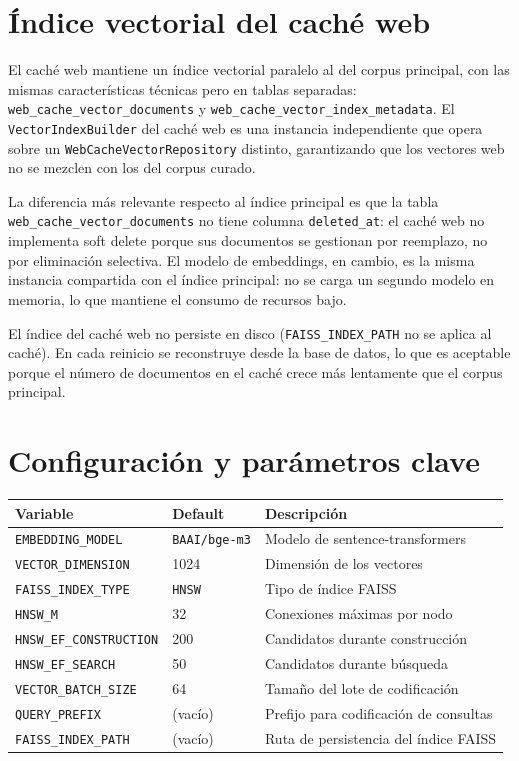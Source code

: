 \documentclass[11pt]{article}
\begin{document}
\section{Índice vectorial del caché web}

El caché web mantiene un índice vectorial paralelo al del corpus principal, con las mismas
características técnicas pero en tablas separadas: \texttt{web\_cache\_vector\_documents} y
\texttt{web\_cache\_vector\_index\_metadata}. El \texttt{VectorIndexBuilder} del caché web
es una instancia independiente que opera sobre un \texttt{WebCacheVectorRepository} distinto,
garantizando que los vectores web no se mezclen con los del corpus curado.

La diferencia más relevante respecto al índice principal es que la tabla
\texttt{web\_cache\_vector\_documents} no tiene columna \texttt{deleted\_at}: el caché web no
implementa soft delete porque sus documentos se gestionan por reemplazo, no por eliminación
selectiva. El modelo de embeddings, en cambio, es la misma instancia compartida con el índice
principal: no se carga un segundo modelo en memoria, lo que mantiene el consumo de recursos
bajo.

El índice del caché web no persiste en disco (\texttt{FAISS\_INDEX\_PATH} no se aplica al
caché). En cada reinicio se reconstruye desde la base de datos, lo que es aceptable porque el
número de documentos en el caché crece más lentamente que el corpus principal.

\section{Configuración y parámetros clave}

\begin{center}
\begin{tabular}{lll}
\toprule
\textbf{Variable} & \textbf{Default} & \textbf{Descripción} \\
\midrule
\texttt{EMBEDDING\_MODEL} & \texttt{BAAI/bge-m3} & Modelo de sentence-transformers \\
\texttt{VECTOR\_DIMENSION} & 1024 & Dimensión de los vectores \\
\texttt{FAISS\_INDEX\_TYPE} & \texttt{HNSW} & Tipo de índice FAISS \\
\texttt{HNSW\_M} & 32 & Conexiones máximas por nodo \\
\texttt{HNSW\_EF\_CONSTRUCTION} & 200 & Candidatos durante construcción \\
\texttt{HNSW\_EF\_SEARCH} & 50 & Candidatos durante búsqueda \\
\texttt{VECTOR\_BATCH\_SIZE} & 64 & Tamaño del lote de codificación \\
\texttt{QUERY\_PREFIX} & (vacío) & Prefijo para codificación de consultas \\
\texttt{FAISS\_INDEX\_PATH} & (vacío) & Ruta de persistencia del índice FAISS \\
\bottomrule
\end{tabular}
\end{center}
\end{document}
